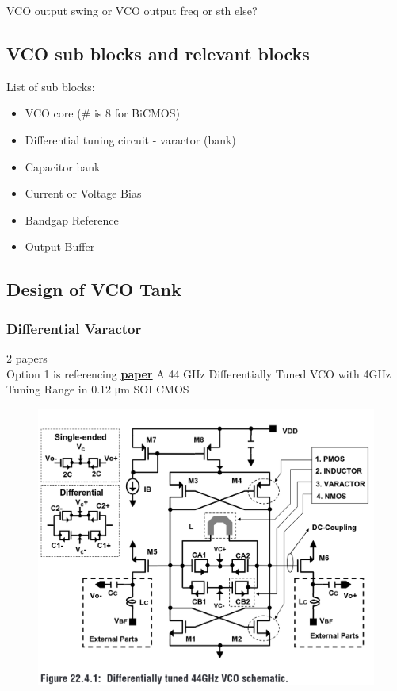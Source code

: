 \begin{question}
	VCO output swing or VCO output freq or sth else?
\end{question}


\subsection{VCO sub blocks and relevant blocks}

List of sub blocks:

\begin{itemize}
	\item VCO core (\# is 8 for BiCMOS)
	\item Differential tuning circuit - varactor (bank)
	\item Capacitor bank
	\item Current or Voltage Bias
	\item Bandgap Reference
	\item Output Buffer
\end{itemize}




\subsection{Design of VCO Tank}


\subsubsection{Differential Varactor}
%
2 papers \\

Option 1 is referencing \href{https://ieeexplore.ieee.org/document/1494046?arnumber=1494046}{\textbf{paper}} A 44 \unit{\GHz} Differentially Tuned VCO with 4GHz Tuning Range in 0.12 \unit{\um} SOI CMOS


\begin{figure}[ht!]
	\centering
	\includegraphics[width=0.5\linewidth]{Figures/diff-var1.png}
	\label{fig:diff-var1}
\end{figure}


